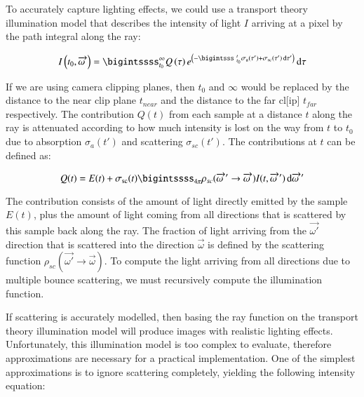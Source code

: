To accurately capture lighting effects, we could use a transport theory illumination model \cite{Krueger91} that describes the intensity of light $I$ arriving at a pixel by the path integral along the ray:

\begin{equation}\label{eq:7.4}
I\left(t_0, \overrightarrow{\omega\ }\right) = \bigintssss_{t_0}^{\infty} Q\left(\tau\right) e^{\left(-\bigintsss_{\ t_0}^{\ t} \sigma_\text{a}\left(\tau'\right) + \sigma_\text{sc}\left(\tau'\right) \, \text{d} \tau'\right)} \, \text{d}\tau
\end{equation}

If we are using camera clipping planes, then $t_0$ and $\infty$ would be replaced
by the distance to the near clip plane $t_{near}$ and the distance to
the far cl[ip] $t_{far}$ respectively. The contribution $Q(t)$ from each sample at a distance $t$ along the ray is attenuated according to how much intensity is lost on the way from $t$ to $t_0$ due to absorption $\sigma_a(t')$ and scattering $\sigma_{sc}(t')$. The
contributions at $t$ can be defined as:

\begin{equation}\label{eq:7.5}
Q(t) = E(t) + \sigma_\text{sc}(t) \bigintssss_{4\pi} \rho_{sc}(\overrightarrow{\omega\ }' \to \overrightarrow{\omega\ }) I(t, \overrightarrow{\omega\ }') \, \text{d}\overrightarrow{\omega\ }'
\end{equation}

The contribution consists of the amount of light directly emitted by the sample $E(t)$, plus the amount of light coming from all directions that is scattered by this sample back along the ray. The fraction of light arriving from the $\vec{\omega'}$ direction that is scattered into the direction $\vec{\omega}$ is defined by the scattering function $\rho_{sc}(\vec{\omega'}\rightarrow \vec{\omega})$. To compute the light arriving from all directions due to multiple bounce scattering, we must recursively compute the illumination function.

If scattering is accurately modelled, then basing the ray function on the transport theory illumination model will produce images with realistic lighting effects. Unfortunately, this illumination model is too complex to evaluate, therefore approximations are necessary for a practical implementation. One of the simplest approximations is to ignore scattering completely, yielding the following intensity equation:

